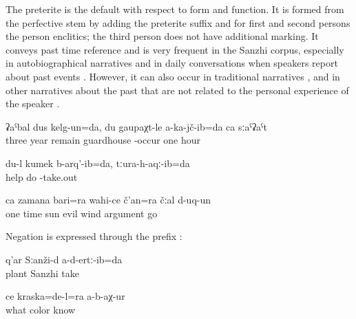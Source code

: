 The preterite is the default  with respect to form and function. It is formed from the perfective stem by adding the preterite suffix and for first and second persons the person enclitics; the third person does not have additional marking. It conveys past time reference and is very frequent in the Sanzhi corpus, especially in autobiographical narratives  and in daily conversations when speakers report about past events . However, it can also occur in traditional narratives ,  and in other narratives about the past that are not related to the personal experience of the speaker .
%
\begin{exe}

	\ex	\label{ex:Three years I remained, I was not one single hour at the guardhouse}
	\gll	ʡaˁbal	dus	kelg-un=da,		du	gaupaχt-le	a-ka-jč-ib=da	ca	sːaˁʡaˁt\\
		three	year	remain			guardhouse	-occur	one	hour\\
	\glt	{}

\ex	\label{ex:I helped. I pulled him out}
	\gll	du-l	kumek	b-arq'-ib=da,	tːura-h-aqː-ib=da\\
			help	do	-take.out\\
	\glt	{}
	
	\ex	\label{ex:Once upon a time the sun and the evil wind argued analytic}
	\gll	ca	zamana	bari=ra	wahi-ce	č'an=ra	čːal	d-uq-un\\
		one	time	sun	evil	wind	argument	go\\
	\glt	{}
\end{exe}

Negation is expressed through the prefix :
%
\begin{exe}
	\ex	\label{ex:We did not gather plants in Sanzhi}
	\gll	q'ar	Sːanži-d	a-d-ertː-ib=da\\
		plant	Sanzhi	take\\
	\glt	{}

	\ex	\label{ex:Nobody found out what colour this is}
	\gll	ce	kraska=de-l=ra	a-b-aχ-ur\\
		what	color	know\\
	\glt	{}
\end{exe}


